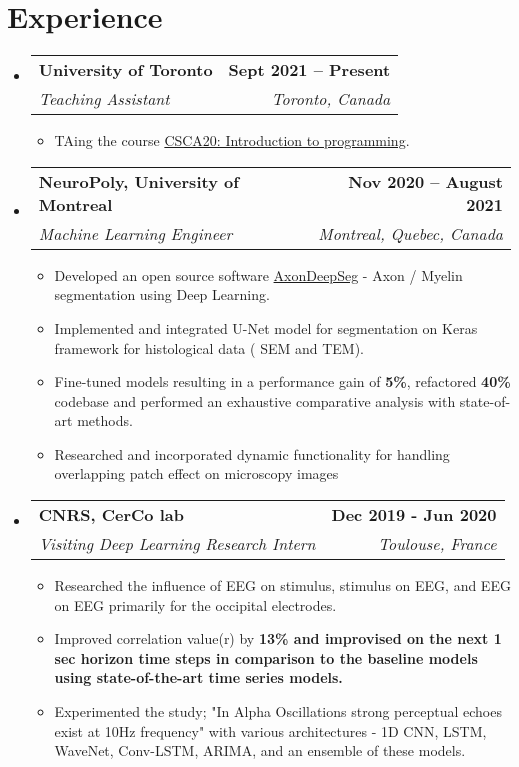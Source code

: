 \documentclass[letterpaper,11pt]{article}
\makeatletter
\newcommand{\resumeItem}[1]{
  \item\small{
    {#1 \vspace{-2pt}}
  }
}
\newcommand{\resumeSubheading}[4]{
  \vspace{-2pt}\item
    \begin{tabular*}{1.0\textwidth}[t]{l@{\extracolsep{\fill}}r}
      \textbf{#1} & \textbf{\small #2} \\
      \textit{\small#3} & \textit{\small #4} \\
    \end{tabular*}\vspace{-7pt}
}
\newcommand{\resumeSubHeadingListStart}{\begin{itemize}[leftmargin=0.0in, label={}]}
\newcommand{\resumeSubHeadingListEnd}{\end{itemize}}
\newcommand{\resumeItemListStart}{\begin{itemize}}
\newcommand{\resumeItemListEnd}{\end{itemize}\vspace{-5pt}}
\makeatother
\begin{document}
\section{Experience}
  \resumeSubHeadingListStart

    \resumeSubheading
      {University of Toronto}{Sept 2021 -- Present}
      {Teaching Assistant}{Toronto, Canada}
      \resumeItemListStart
        \resumeItem{TAing the course \href{http://www.brianharrington.net/}{CSCA20: Introduction to programming}.}
      \resumeItemListEnd

    \resumeSubheading
      {NeuroPoly, University of Montreal}{Nov 2020 -- August 2021}
      {Machine Learning Engineer}{Montreal, Quebec, Canada}
      \resumeItemListStart
        \resumeItem {Developed an open source software  \href{https://github.com/neuropoly/axondeepseg}{AxonDeepSeg} - Axon / Myelin segmentation using Deep Learning.} 
         \resumeItem {Implemented and integrated U-Net model for segmentation on Keras framework for histological data ( SEM and TEM).}
        \resumeItem {Fine-tuned models resulting in a performance gain of {\bf 5\%}, refactored \textbf{40\%} codebase and performed an exhaustive comparative analysis with state-of-art methods.}
        \resumeItem {Researched and incorporated dynamic functionality for handling overlapping patch effect on microscopy images}
    \resumeItemListEnd

    \resumeSubheading
    {CNRS, CerCo lab}{Dec 2019 - Jun 2020}
    {Visiting Deep Learning Research Intern}{Toulouse, France}
        \resumeItemListStart
            \resumeItem{Researched the influence of EEG on stimulus, stimulus on EEG, and EEG on EEG primarily for the occipital electrodes.}\resumeItem{Improved correlation value(r) by \bf{13\%} and improvised on the next 1 sec horizon time steps in comparison to the baseline models using state-of-the-art time series models.}
            \resumeItem{Experimented the study; "In Alpha Oscillations strong perceptual echoes exist at 10Hz frequency" with various architectures - 1D CNN, LSTM, WaveNet, Conv-LSTM, ARIMA, and an ensemble of these models.}
        \resumeItemListEnd
  \resumeSubHeadingListEnd
\vspace{-16pt}
\end{document}

